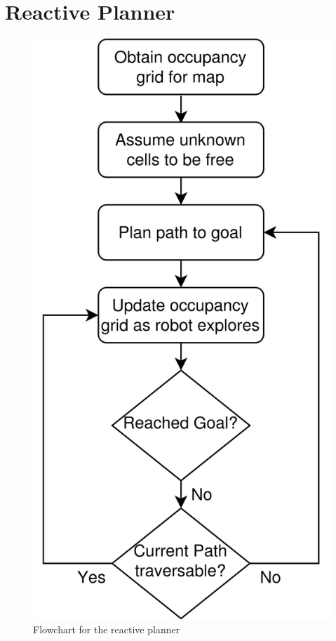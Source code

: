 \documentclass[a4paper,12pt]{article}
\begin{document}
	\pagebreak
	
	\tableofcontents
	
	\pagebreak
	
	\section{Reactive Planner}
		\begin{figure}[H]
			\centering
			\includegraphics[scale=0.13]{images/reactivePlannerFlowchart.png}
			\caption{Flowchart for the reactive planner}
			\label{reactivePlannerFlowchart}
		\end{figure}
	
\end{document}
